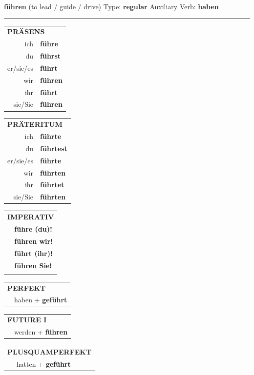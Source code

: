 \documentclass[10pt,a4paper]{revtex4-2}
\begin{document}
\begin{verbbox}
    {\Large \bf führen} (to lead / guide / drive) \hfill Type: \textbf{regular} \hfill Auxiliary Verb: \textbf{haben} 
    
     \vspace{5pt}

    \hrule
    
    \vspace{5pt}

  \begin{tabular}{rl}
     \multicolumn{2}{l}{\textbf{PRÄSENS} }\\
    ich & \textbf{führe}\\
    du & \textbf{führst}\\
    er/sie/es & \textbf{führt}\\
    wir & \textbf{führen}\\
    ihr & \textbf{führt}\\
    sie/Sie & \textbf{führen}\\
  \end{tabular}
  \hfill
  \begin{tabular}{rl}
    \multicolumn{2}{l}{\textbf{PRÄTERITUM} }\\
    ich & \textbf{führte}\\
    du & \textbf{führtest}\\
    er/sie/es & \textbf{führte}\\
    wir & \textbf{führten}\\
    ihr & \textbf{führtet}\\
    sie/Sie & \textbf{führten}\\
  \end{tabular}
  \hfill
  \begin{tabular}{rl}
     \multicolumn{2}{l}{\textbf{IMPERATIV} }\\
   & \textbf{führe (du)!}\\
   & \textbf{führen wir!}\\
   & \textbf{führt (ihr)!}\\
   & \textbf{führen Sie!}\\
   & \vspace{10pt}
  \end{tabular}

 \vspace{10pt}

 \begin{tabular}{rl}
     \multicolumn{2}{l}{\textbf{PERFEKT}}\\
   & haben + \textbf{geführt}\\
  \end{tabular}
\hfill
\begin{tabular}{rl}
    \multicolumn{2}{l}{\textbf{FUTURE I}}\\
   & werden + \textbf{führen}\\
  \end{tabular}
\hfill
\begin{tabular}{rl}
    \multicolumn{2}{l}{\textbf{PLUSQUAMPERFEKT}}\\
   & hatten + \textbf{geführt}\\
  \end{tabular}


\end{verbbox}
\end{document}
